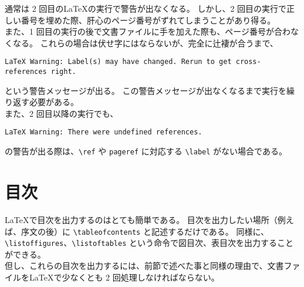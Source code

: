 通常は 2 回目の\LaTeX{}の実行で警告が出なくなる。
しかし、2 回目の実行で正しい番号を埋めた際、肝心のページ番号がずれてしまうことがあり得る。\\

また、1 回目の実行の後で文書ファイルに手を加えた際も、ページ番号が合わなくなる。
これらの場合は伏せ字にはならないが、完全に辻褄が合うまで、
\begin{mdframed}[roundcorner=0.50zw,leftmargin=3.00zw,rightmargin=3.00zw,skipabove=0.40zw,skipbelow=0.40zw,innertopmargin=4.00pt,innerbottommargin=4.00pt,innerleftmargin=5.00pt,innerrightmargin=5.00pt,linecolor=gray!090,linewidth=0.50pt,backgroundcolor=gray!90]\color{gray!10}
\begin{verbatim}
LaTeX Warning: Label(s) may have changed. Rerun to get cross-references right.
\end{verbatim}
\end{mdframed}
という警告メッセージが出る。
この警告メッセージが出なくなるまで実行を繰り返す必要がある。\\

また、2 回目以降の実行でも、
\begin{mdframed}[roundcorner=0.50zw,leftmargin=3.00zw,rightmargin=3.00zw,skipabove=0.40zw,skipbelow=0.40zw,innertopmargin=4.00pt,innerbottommargin=4.00pt,innerleftmargin=5.00pt,innerrightmargin=5.00pt,linecolor=gray!090,linewidth=0.50pt,backgroundcolor=gray!90]\color{gray!10}
\begin{verbatim}
LaTeX Warning: There were undefined references.
\end{verbatim}
\end{mdframed}
の警告が出る際は、\verb'\ref' や \verb'pageref' に対応する \verb'\label' がない場合である。
\section{目次}
\LaTeX{}で目次を出力するのはとても簡単である。
目次を出力したい場所（例えば、序文の後）に \verb'\tableofcontents' と記述するだけである。
同様に、\verb'\listoffigures'、\verb'\listoftables' という命令で図目次、表目次を出力することができる。\\

但し、これらの目次を出力するには、前節で述べた事と同様の理由で、文書ファイルを\LaTeX{}で少なくとも 2 回処理しなければならない。\\


